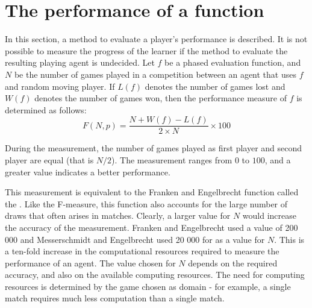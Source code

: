 \section{The performance of a function}
\label{sec:learning-performance}
In this section, a method to evaluate a player's performance is described.  It is not possible to measure the progress of the learner if the method to evaluate the resulting playing agent is undecided. Let $f$ be a phased evaluation function, and $N$ be the number of games played in a competition between an agent that uses $f$ and random moving player. If $L(f)$ denotes the number of games lost and $W(f)$ denotes the number of games won, then the performance measure of $f$ is determined as follows:
\begin{equation}
	F(N,p) =  \frac{N + W(f) - L(f)}{2 \times N} \times 100
	\label{eq:performance}
\end{equation}

During the measurement, the number of games played as first player and second player are equal (that is $N/2$). The measurement ranges from $0$ to $100$, and a greater value indicates a better performance. 

This measurement is equivalent to the Franken and Engelbrecht \cite{franken:checkers} function called the .  Like the F-measure, this function also accounts for the large number of draws that often arises in  matches. 
Clearly, a larger value for $N$ would increase the accuracy of the measurement. Franken and Engelbrecht \cite{franken:checkers} used a value of 200 000 and Messerschmidt and Engelbrecht \cite{messerschmidt:learning} used 20 000 for   as a value for $N$. This is a ten-fold increase in the computational resources required to measure the performance of an agent.  The value chosen for $N$ depends on the required accuracy, and also on the available computing resources.  The need for computing resources is determined by the game chosen as domain - for example, a single  match requires much less computation than a single  match.      

